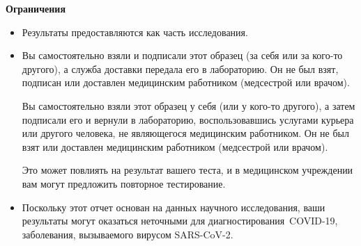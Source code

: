 \documentclass[10pt]{article}
\begin{document}
\textbf{Ограничения}

\begin{itemize}

\item

  Результаты предоставляются как часть исследования.

\item
  Вы самостоятельно взяли и подписали этот образец (за себя или за кого-то
  другого), а служба доставки передала его в лабораторию. Он не был взят,
  подписан или доставлен медицинским работником (медсестрой или врачом).

  Вы самостоятельно взяли этот образец у себя (или у кого-то другого), а затем
  подписали его и вернули в лабораторию, воспользовавшись услугами курьера или
  другого человека, не являющегося медицинским работником. Он не был взят или
  доставлен медицинским работником (медсестрой или врачом). 



  Это может повлиять на результат вашего теста, и в медицинском учреждении вам
  могут предложить повторное тестирование.

\item

  Поскольку этот отчет основан на данных научного исследования, ваши результаты
  могут оказаться неточными для диагностирования COVID-19, заболевания,
  вызываемого вирусом SARS-CoV-2.

\end{itemize}
\end{document}
